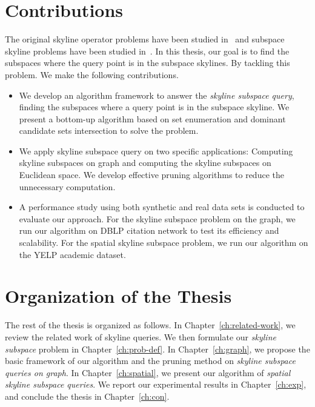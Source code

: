 \section{Contributions}
The original skyline operator problems have been studied in~\cite{borzsony2001skyline, chomicki2003skyline} and subspace skyline problems have been studied in~\cite{pei2005catching, yuan2005efficient}. In this thesis, our goal is to find the subspaces where the query point is in the subspace skylines. By tackling this problem. We make the following contributions.

\begin{itemize}
\item We develop an algorithm framework to answer the \emph{skyline subspace query}, finding the subspaces where a query point is in the subspace skyline. We present a bottom-up algorithm based on set enumeration and dominant candidate sets intersection to solve the problem.

\item We apply skyline subspace query on two specific applications: Computing skyline subspaces on graph and computing the skyline subspaces on Euclidean space. We develop effective pruning algorithms to reduce the unnecessary computation.

\item A performance study using both synthetic and real data sets is conducted to evaluate our approach. For the skyline subspace problem on the graph, we run our algorithm on DBLP citation network to test its efficiency and scalability. For the spatial skyline subspace problem, we run our algorithm on the YELP academic dataset.
\end{itemize}
  

\section{Organization of the Thesis}
The rest of the thesis is organized as follows. In Chapter~\ref{ch:related-work}, we review the related work of skyline queries. We then formulate our \emph{skyline subspace} problem in Chapter~\ref{ch:prob-def}. In Chapter~\ref{ch:graph}, we propose the basic framework of our algorithm and the pruning method on \emph{skyline subspace queries on graph}.  In Chapter~\ref{ch:spatial}, we present our algorithm of \emph{spatial skyline subspace queries}.  We report our experimental results in Chapter~\ref{ch:exp}, and conclude the thesis in Chapter~\ref{ch:con}.










